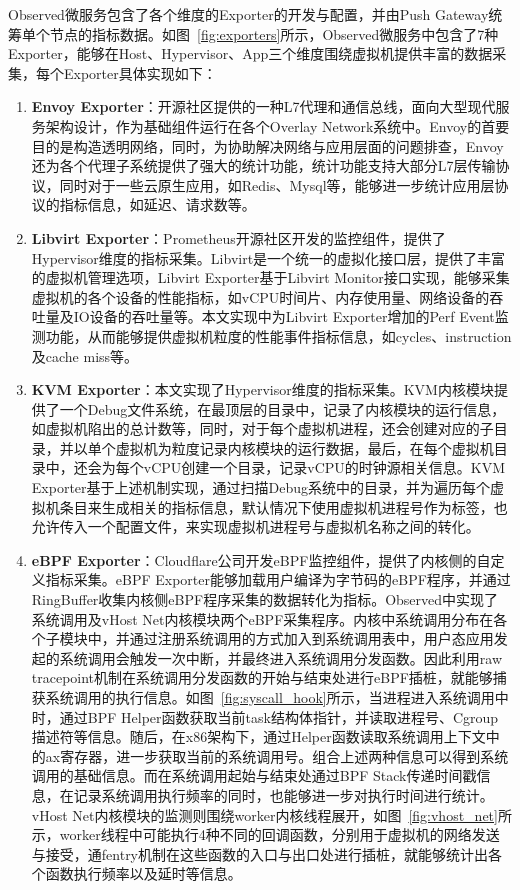Observed微服务包含了各个维度的Exporter的开发与配置，并由Push Gateway统筹单个节点的指标数据。如图~\ref{fig:exporters}所示，Observed微服务中包含了7种Exporter，能够在Host、Hypervisor、App三个维度围绕虚拟机提供丰富的数据采集，每个Exporter具体实现如下：

\begin{enumerate}

    \item \textbf{Envoy Exporter}：开源社区提供的一种L7代理和通信总线，面向大型现代服务架构设计，作为基础组件运行在各个Overlay Network系统中。Envoy的首要目的是构造透明网络，同时，为协助解决网络与应用层面的问题排查，Envoy还为各个代理子系统提供了强大的统计功能，统计功能支持大部分L7层传输协议，同时对于一些云原生应用，如Redis、Mysql等，能够进一步统计应用层协议的指标信息，如延迟、请求数等。
    
    \item \textbf{Libvirt Exporter}：Prometheus开源社区开发的监控组件，提供了Hypervisor维度的指标采集。Libvirt是一个统一的虚拟化接口层，提供了丰富的虚拟机管理选项，Libvirt Exporter基于Libvirt Monitor接口实现，能够采集虚拟机的各个设备的性能指标，如vCPU时间片、内存使用量、网络设备的吞吐量及IO设备的吞吐量等。本文实现中为Libvirt Exporter增加的Perf Event监测功能，从而能够提供虚拟机粒度的性能事件指标信息，如cycles、instruction及cache miss等。
    
    \item \textbf{KVM Exporter}：本文实现了Hypervisor维度的指标采集。KVM内核模块提供了一个Debug文件系统，在最顶层的目录中，记录了内核模块的运行信息，如虚拟机陷出的总计数等，同时，对于每个虚拟机进程，还会创建对应的子目录，并以单个虚拟机为粒度记录内核模块的运行数据，最后，在每个虚拟机目录中，还会为每个vCPU创建一个目录，记录vCPU的时钟源相关信息。KVM Exporter基于上述机制实现，通过扫描Debug系统中的目录，并为遍历每个虚拟机条目来生成相关的指标信息，默认情况下使用虚拟机进程号作为标签，也允许传入一个配置文件，来实现虚拟机进程号与虚拟机名称之间的转化。

    \item \textbf{eBPF Exporter}：Cloudflare公司开发eBPF监控组件，提供了内核侧的自定义指标采集。eBPF Exporter能够加载用户编译为字节码的eBPF程序，并通过RingBuffer收集内核侧eBPF程序采集的数据转化为指标。Observed中实现了系统调用及vHost Net内核模块两个eBPF采集程序。内核中系统调用分布在各个子模块中，并通过注册系统调用的方式加入到系统调用表中，用户态应用发起的系统调用会触发一次中断，并最终进入系统调用分发函数。因此利用raw tracepoint机制在系统调用分发函数的开始与结束处进行eBPF插桩，就能够捕获系统调用的执行信息。如图~\ref{fig:syscall_hook}所示，当进程进入系统调用中时，通过BPF Helper函数获取当前task结构体指针，并读取进程号、Cgroup描述符等信息。随后，在x86架构下，通过Helper函数读取系统调用上下文中的ax寄存器，进一步获取当前的系统调用号。组合上述两种信息可以得到系统调用的基础信息。而在系统调用起始与结束处通过BPF Stack传递时间戳信息，在记录系统调用执行频率的同时，也能够进一步对执行时间进行统计。vHost Net内核模块的监测则围绕worker内核线程展开，如图~\ref{fig:vhost_net}所示，worker线程中可能执行4种不同的回调函数，分别用于虚拟机的网络发送与接受，通fentry机制在这些函数的入口与出口处进行插桩，就能够统计出各个函数执行频率以及延时等信息。


\end{enumerate}
